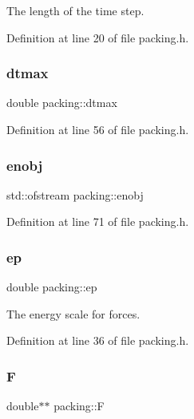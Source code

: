 The length of the time step. 



Definition at line 20 of file packing.\+h.

\mbox{\label{classpacking_ae4a4b73d1937c50d564cd71886d17fab}} 
\subsubsection{\texorpdfstring{dtmax}{dtmax}}
{\footnotesize\ttfamily double packing\+::dtmax\hspace{0.3cm}{\ttfamily [protected]}}



Definition at line 56 of file packing.\+h.

\mbox{\label{classpacking_acc65e17d00c4ae7ed3efee0da9693144}} 
\subsubsection{\texorpdfstring{enobj}{enobj}}
{\footnotesize\ttfamily std\+::ofstream packing\+::enobj\hspace{0.3cm}{\ttfamily [protected]}}



Definition at line 71 of file packing.\+h.

\mbox{\label{classpacking_a1c04efa5180dbc7100daa11b1b0728f7}} 
\subsubsection{\texorpdfstring{ep}{ep}}
{\footnotesize\ttfamily double packing\+::ep\hspace{0.3cm}{\ttfamily [protected]}}



The energy scale for forces. 



Definition at line 36 of file packing.\+h.

\mbox{\label{classpacking_a39113604e4ffe9563e79e8289e6eed61}} 
\subsubsection{\texorpdfstring{F}{F}}
{\footnotesize\ttfamily double$\ast$$\ast$ packing\+::F\hspace{0.3cm}{\ttfamily [protected]}}



